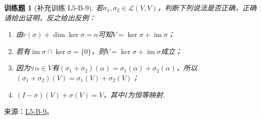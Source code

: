 \documentclass[12pt,fontset=fandol]{ctexart}
\newtheorem{exercise}{训练题}[section]
\begin{document}
\begin{exercise}[补充训练 L5-B-9]\label{prob:L5-B-9}
若$\sigma_1,\sigma_2\in \mathcal{L}(V,V)$，判断下列说法是否正确，正确请给出证明，反之给出反例：
        \begin{enumerate}
            \item 由$r(\sigma)+\dim\ker\sigma=n$可知$V=\ker\sigma+\operatorname{im} \sigma$；

            \item 若有$\operatorname{im} \sigma \cap \ker \sigma = \{0\}$，则$V=\ker\sigma+\operatorname{im} \sigma$成立；

            \item 因为$\forall \alpha \in V$有$(\sigma_1+\sigma_2)(\alpha)=\sigma_1(\alpha)+\sigma_2(\alpha)$，所以$(\sigma_1+\sigma_2)(V)=\sigma_1(V)+\sigma_2(V)$；

            \item $(I-\sigma)(V)+\sigma(V)=V$，其中$I$为恒等映射.
        \end{enumerate}
\end{exercise}
\noindent 来源：\href{https://github.com/yhwu-is/Linear-Algebra-Left-Undone/blob/new/%E8%AE%B2%E4%B9%89/%E4%B8%93%E9%A2%98/5%20%E7%BA%BF%E6%80%A7%E6%98%A0%E5%B0%84.tex}{L5-B-9}。
\end{document}
